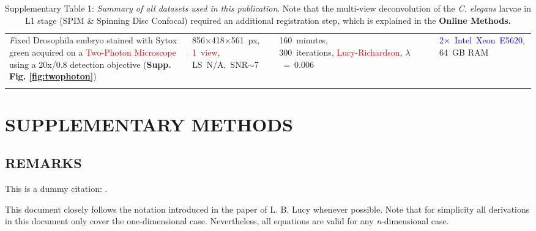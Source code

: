 \documentclass[]{spie}  %
\begin{document}
\begin{savenotes}
\begin{table}[h!]
{\begin{tabular}{p{5.5cm}p{3.0cm}p{3.6cm}p{3.5cm}}
\\
\emph Fixed {Drosophila} embryo stained with Sytox green acquired on a \textcolor{red}{Two-Photon Microscope} using a 20x/0.8 detection objective (\textbf{Supp. Fig. \ref{fig:twophoton}}) & \mbox{856$\times$418$\times$561~px}, \textcolor{red}{\mbox{1~view}}, \mbox{LS N/A, SNR$\sim$7} & \mbox{160 minutes,~~~~~~~~~~~~~~~~} \mbox{300 iterations}, \textcolor{red}{\mbox{Lucy-Richardson}}, $\lambda$~=~0.006 & \mbox{\textcolor{blue}{2$\times$~Intel~Xeon E5620}}, 64~GB RAM\\
\\
\end{tabular}}
\caption{Supplementary Table 1: \emph{Summary of all datasets used in this publication}. Note that the multi-view deconvolution of the \emph{C. elegans} larvae in L1 stage (SPIM \& Spinning Disc Confocal) required an additional registration step, which is explained in the \bf{Online Methods}.}
\label{tab:experiments2}
\end{table}
\end{savenotes}

\pagebreak

\section{SUPPLEMENTARY METHODS}
\label{sec:sup-methods}

\subsection*{REMARKS}

This is a dummy citation: \cite{dummy-cite}.

This document closely follows the notation introduced in the paper of L. B. Lucy\cite{lucy1974} whenever possible.
Note that for simplicity all derivations in this document only cover the one-dimensional case. Nevertheless, all equations are valid for any \emph{n}-dimensional case.
\end{document}
